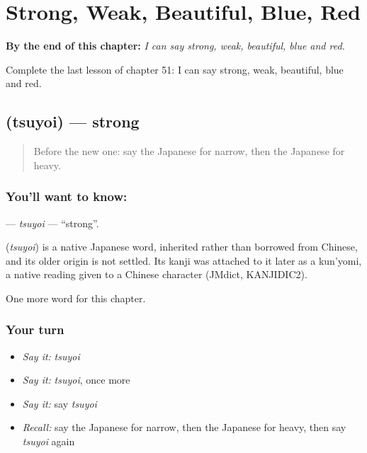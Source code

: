 
\chapter{Strong, Weak, Beautiful, Blue, Red}
\label{ch:ja-strong-weak-beautiful-blue-red}

\begin{chapteropening}
\textbf{By the end of this chapter:} \emph{I can say strong, weak, beautiful, blue and red.}

Complete the last lesson of chapter 51: I can say strong, weak, beautiful, blue and red.
\end{chapteropening}

\section[\texorpdfstring{\ja{つよい} (tsuyoi)}{つよい (tsuyoi)}]{ (tsuyoi) — strong}

\label{lesson:JA-C51-tsuyoi}



\begin{quote}
Before the new one: say the Japanese for narrow, then the Japanese for heavy.
\end{quote}

\subsection*{You'll want to know: }
\textbf{} — \emph{tsuyoi} — \textquotedblleft{}strong\textquotedblright{}.

\begin{cousinweb}
\textbf{} (\emph{tsuyoi}) is a native Japanese word, inherited rather than borrowed from Chinese, and its older origin is not settled. Its kanji was attached to it later as a kun'yomi, a native reading given to a Chinese character (JMdict, KANJIDIC2).
\end{cousinweb}

\begin{grammarlens}[title={What you've built}]
One more word for this chapter.
\end{grammarlens}

\subsection*{Your turn}
\begin{itemize}
\raggedright
  \item \emph{Say it:} \emph{tsuyoi}
  \item \emph{Say it:} \emph{tsuyoi}, once more
  \item \emph{Say it:} say \emph{tsuyoi}
  \item \emph{Recall:} say the Japanese for narrow, then the Japanese for heavy, then say \emph{tsuyoi} again
\end{itemize}

